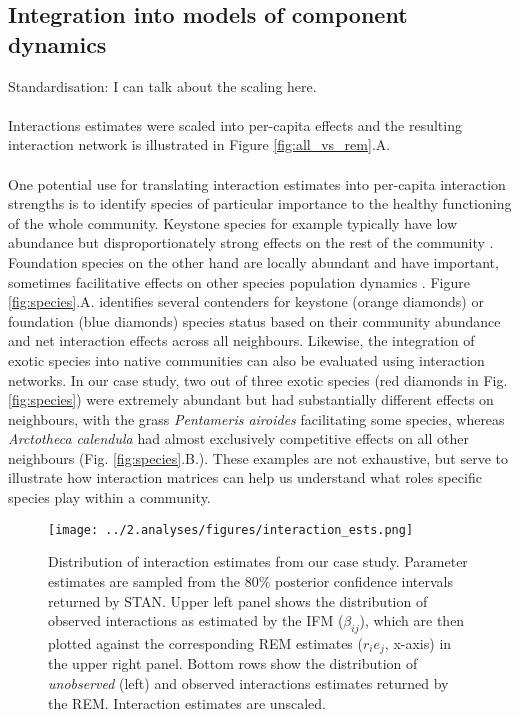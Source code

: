 \documentclass[a4,12pt]{article}
\begin{document}
  

    \subsection{Integration into models of component dynamics}
    
    Standardisation: I can talk about the scaling here. 


	\paragraph{} 

 Interactions estimates were scaled into per-capita effects and the resulting interaction network is illustrated in Figure \ref{fig:all_vs_rem}.A.

	    \paragraph{} 
    One potential use for translating interaction estimates into per-capita interaction strengths is to identify species of particular importance to the healthy functioning of the whole community. Keystone species for example typically have low abundance but disproportionately strong effects on the rest of the community \parencite{Power1996}. Foundation species on the other hand are locally abundant and have important, sometimes facilitative effects on other species population dynamics \parencite{Ellison2019}. Figure \ref{fig:species}.A. identifies several contenders for keystone (orange diamonds) or foundation (blue diamonds) species status based on their community abundance and net interaction effects across all neighbours. Likewise, the integration of exotic species into native communities can also be evaluated using interaction networks. In our case study, two out of three exotic species (red diamonds in Fig. \ref{fig:species}) were extremely abundant but had substantially different effects on neighbours, with the grass \textit{Pentameris airoides} facilitating some species, whereas \textit{Arctotheca calendula} had almost exclusively competitive effects on all other neighbours (Fig. \ref{fig:species}.B.). These examples are not exhaustive, but serve to illustrate how interaction matrices can help us understand what roles specific species play within a community. 


    \begin{figure}[H]
        \texttt{[image: ../2.analyses/figures/interaction\_ests.png]}
        \caption{Distribution of interaction estimates from our case study. Parameter estimates are sampled from the 80\% posterior confidence intervals returned by STAN. Upper left panel shows the distribution of observed interactions as estimated by the IFM ($\beta_{ij}$), which are then plotted against the corresponding REM estimates ($r_i e_j$, x-axis) in the upper right panel. Bottom rows show the distribution of \textit{unobserved} (left) and observed interactions estimates returned by the REM. Interaction estimates are unscaled.}
        \label{fig:adist}
    \end{figure}
\end{document}

